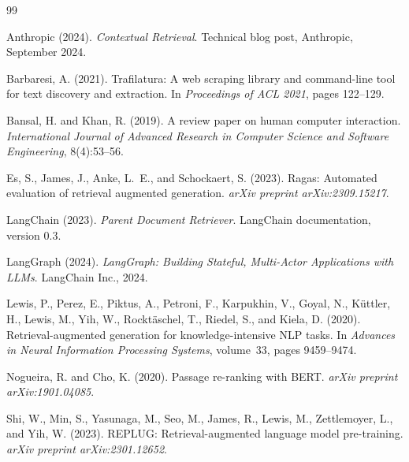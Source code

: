\documentclass[11pt,a4paper]{article}
\begin{document}
\newpage
{}
{}

\begin{thebibliography}{99}

Anthropic (2024).
\newblock \emph{Contextual Retrieval}.
\newblock Technical blog post, Anthropic, September 2024.

Barbaresi, A. (2021).
\newblock Trafilatura: A web scraping library and command-line tool for text
  discovery and extraction.
\newblock In \emph{Proceedings of ACL 2021}, pages 122--129.

Bansal, H. and Khan, R. (2019).
\newblock A review paper on human computer interaction.
\newblock \emph{International Journal of Advanced Research in Computer Science
  and Software Engineering}, 8(4):53--56.

Es, S., James, J., Anke, L.~E., and Schockaert, S. (2023).
\newblock Ragas: Automated evaluation of retrieval augmented generation.
\newblock \emph{arXiv preprint arXiv:2309.15217}.

LangChain (2023).
\newblock \emph{Parent Document Retriever}.
\newblock LangChain documentation, version 0.3.

LangGraph (2024).
\newblock \emph{LangGraph: Building Stateful, Multi-Actor Applications with LLMs}.
\newblock LangChain Inc., 2024.

Lewis, P., Perez, E., Piktus, A., Petroni, F., Karpukhin, V., Goyal, N., K\"{u}ttler, H.,
  Lewis, M., Yih, W., Rockt\"{a}schel, T., Riedel, S., and Kiela, D. (2020).
\newblock Retrieval-augmented generation for knowledge-intensive NLP tasks.
\newblock In \emph{Advances in Neural Information Processing Systems},
  volume~33, pages 9459--9474.

Nogueira, R. and Cho, K. (2020).
\newblock Passage re-ranking with BERT.
\newblock \emph{arXiv preprint arXiv:1901.04085}.

Shi, W., Min, S., Yasunaga, M., Seo, M., James, R., Lewis, M., Zettlemoyer, L., and
  Yih, W. (2023).
\newblock REPLUG: Retrieval-augmented language model pre-training.
\newblock \emph{arXiv preprint arXiv:2301.12652}.


\end{thebibliography}
\end{document}
